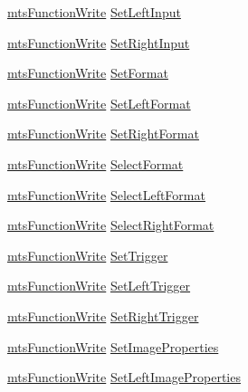 \begin{DoxyCompactItemize}
\item 
\hyperlink{classmts_function_write}{mts\+Function\+Write} \hyperlink{class_i_req_filter_source_video_capture_ab05c1c7aec272a4f79058f67cafd7ae1}{Set\+Left\+Input}
\item 
\hyperlink{classmts_function_write}{mts\+Function\+Write} \hyperlink{class_i_req_filter_source_video_capture_a65be646e690f42696d693b5649a5940e}{Set\+Right\+Input}
\item 
\hyperlink{classmts_function_write}{mts\+Function\+Write} \hyperlink{class_i_req_filter_source_video_capture_afe544baf681481dab6037d5114800da5}{Set\+Format}
\item 
\hyperlink{classmts_function_write}{mts\+Function\+Write} \hyperlink{class_i_req_filter_source_video_capture_a9363af0eb4d3f09c46522f58cc0d6183}{Set\+Left\+Format}
\item 
\hyperlink{classmts_function_write}{mts\+Function\+Write} \hyperlink{class_i_req_filter_source_video_capture_acbd209c704993935cbc202f3d11ba9de}{Set\+Right\+Format}
\item 
\hyperlink{classmts_function_write}{mts\+Function\+Write} \hyperlink{class_i_req_filter_source_video_capture_a7531cd4f6275e2044ad08049fa51ade6}{Select\+Format}
\item 
\hyperlink{classmts_function_write}{mts\+Function\+Write} \hyperlink{class_i_req_filter_source_video_capture_ab419fc7d7c6e2374f4b00c7647194412}{Select\+Left\+Format}
\item 
\hyperlink{classmts_function_write}{mts\+Function\+Write} \hyperlink{class_i_req_filter_source_video_capture_a4735a354070f1ad68635f08d10bd521c}{Select\+Right\+Format}
\item 
\hyperlink{classmts_function_write}{mts\+Function\+Write} \hyperlink{class_i_req_filter_source_video_capture_a98af73f8fa32e3104594021816f91175}{Set\+Trigger}
\item 
\hyperlink{classmts_function_write}{mts\+Function\+Write} \hyperlink{class_i_req_filter_source_video_capture_a226e2eaecff79d765568ffc0c5d1044d}{Set\+Left\+Trigger}
\item 
\hyperlink{classmts_function_write}{mts\+Function\+Write} \hyperlink{class_i_req_filter_source_video_capture_a2e4c7dd3ff46016da70c23ffe9730552}{Set\+Right\+Trigger}
\item 
\hyperlink{classmts_function_write}{mts\+Function\+Write} \hyperlink{class_i_req_filter_source_video_capture_a43f477dd29f145e55d5cad84666165cf}{Set\+Image\+Properties}
\item 
\hyperlink{classmts_function_write}{mts\+Function\+Write} \hyperlink{class_i_req_filter_source_video_capture_a076a7b2117147892512418de39ae4939}{Set\+Left\+Image\+Properties}

\end{DoxyCompactItemize}
